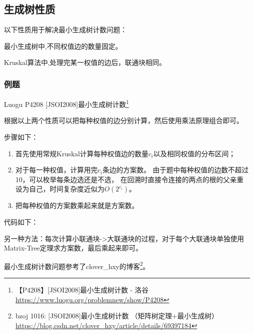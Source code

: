 \subsection{生成树性质}
以下性质用于解决最小生成树计数问题：
\begin{property}
	最小生成树中,不同权值边的数量固定。
\end{property}
\begin{property}
	Kruskal算法中,处理完某一权值的边后，联通块相同。
\end{property}
\subsubsection{例题}

Luogu P4208 [JSOI2008]最小生成树计数\footnote{
【P4208】[JSOI2008]最小生成树计数 - 洛谷
\url{https://www.luogu.org/problemnew/show/P4208}
}

根据以上两个性质可以把每种权值的边分别计算，然后使用乘法原理组合即可。

步骤如下：
\begin{enumerate}
	\item 首先使用常规Kruskal计算每种权值边的数量$c_i$以及相同权值的分布区间；
	\item 对于每一种权值，计算用完$c_i$条边的方案数。
	      由于题中每种权值的边数不超过10，可以枚举每条边选还是不选，
	      在回溯时直接令连接的两点的根的父亲重设为自己，时间复杂度近似为$O(2^{c_i})$。
	\item 把每种权值的方案数乘起来就是方案数。
\end{enumerate}

代码如下：


另一种方法：每次计算小联通块->大联通块的过程，对于每个大联通块单独使用
Matrix-Tree定理求方案数，最后乘起来即可。

最小生成树计数问题参考了clover\_hxy的博客\footnote{
bzoj 1016: [JSOI2008]最小生成树计数 （矩阵树定理+最小生成树）
\url{https://blog.csdn.net/clover\_hxy/article/details/69397184}
}。
